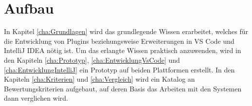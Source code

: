 \section{Aufbau}
\label{sec:Aufbau}

In Kapitel \ref{cha:Grundlagen} wird das grundlegende 
Wissen erarbeitet, welches für die Entwicklung von Plugins 
beziehungsweise Erweiterungen in VS Code und IntelliJ IDEA nötig ist.
Um das erlangte Wissen praktisch anzuwenden, wird in
den Kapiteln \ref{cha:Prototyp}, \ref{cha:EntwicklungVsCode} und \ref{cha:EntwicklungIntelliJ} 
ein Prototyp auf beiden Plattformen erstellt.
In den Kapiteln \ref{cha:Kriterien} und \ref{cha:Vergleich} wird ein Katalog 
an Bewertungskriterien aufgebaut, auf deren Basis 
das Arbeiten mit den Systemen dann verglichen wird.
